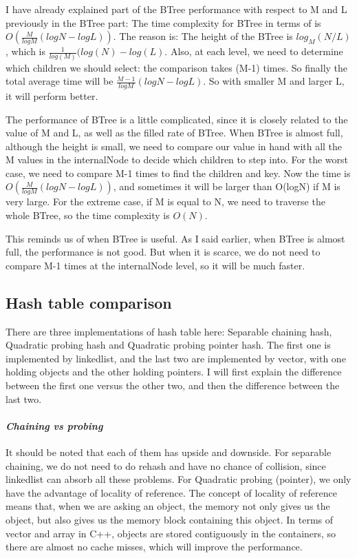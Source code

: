 \documentclass[]{article}
\let\oldparagraph\paragraph
\renewcommand{\paragraph}[1]{\oldparagraph{#1}\mbox{}}
\begin{document}
I have already explained part of the BTree performance with respect to M
and L previously in the BTree part: The time complexity for BTree in
terms of is \(O(\frac{M}{logM}(logN-logL))\). The reason is: The height
of the BTree is \(log_M(N/L)\), which is
\(\frac{1}{log(M)}(log(N)-log(L)\). Also, at each level, we need to
determine which children we should select: the comparison takes (M-1)
times. So finally the total average time will be
\(\frac{M-1}{logM}(logN-logL)\). So with smaller M and larger L, it will
perform better.

The performance of BTree is a little complicated, since it is closely
related to the value of M and L, as well as the filled rate of BTree.
When BTree is almost full, although the height is small, we need to
compare our value in hand with all the M values in the internalNode to
decide which children to step into. For the worst case, we need to
compare M-1 times to find the children and key. Now the time is
\(O(\frac{M}{logM}(logN-logL))\), and sometimes it will be larger than
O(logN) if M is very large. For the extreme case, if M is equal to N, we
need to traverse the whole BTree, so the time complexity is \(O(N)\).

This reminds us of when BTree is useful. As I said earlier, when BTree
is almost full, the performance is not good. But when it is scarce, we
do not need to compare M-1 times at the internalNode level, so it will
be much faster.

\subsection{Hash table comparison}\label{hash-table-comparison}

There are three implementations of hash table here: Separable chaining
hash, Quadratic probing hash and Quadratic probing pointer hash. The
first one is implemented by linkedlist, and the last two are implemented
by vector, with one holding objects and the other holding pointers. I
will first explain the difference between the first one versus the other
two, and then the difference between the last two.

\paragraph{\texorpdfstring{\emph{Chaining vs
probing}}{Chaining vs probing}}\label{chaining-vs-probing}

It should be noted that each of them has upside and downside. For
separable chaining, we do not need to do rehash and have no chance of
collision, since linkedlist can absorb all these problems. For Quadratic
probing (pointer), we only have the advantage of locality of reference.
The concept of locality of reference means that, when we are asking an
object, the memory not only gives us the object, but also gives us the
memory block containing this object. In terms of vector and array in
C++, objects are stored contiguously in the containers, so there are
almost no cache misses, which will improve the performance.
\end{document}
